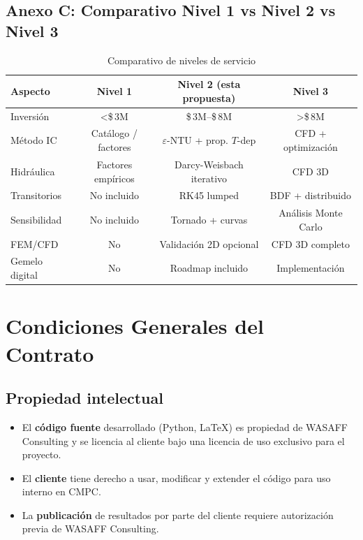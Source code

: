 \documentclass[11pt,a4paper]{article}
\begin{document}
\subsection{Anexo C: Comparativo Nivel 1 vs Nivel 2 vs Nivel 3}

\begin{table}[H]
\centering
\caption{Comparativo de niveles de servicio}
\begin{tabular}{@{}lccc@{}}
\toprule
\textbf{Aspecto} & \textbf{Nivel 1} & \textbf{Nivel 2 (esta propuesta)} & \textbf{Nivel 3} \\
\midrule
Inversión & <\$\,3M & \$\,3M--\$\,8M & >\$\,8M \\
Método IC & Catálogo / factores & $\varepsilon$-NTU + prop. $T$-dep & CFD + optimización \\
Hidráulica & Factores empíricos & Darcy-Weisbach iterativo & CFD 3D \\
Transitorios & No incluido & RK45 lumped & BDF + distribuido \\
Sensibilidad & No incluido & Tornado + curvas & Análisis Monte Carlo \\
FEM/CFD & No & Validación 2D opcional & CFD 3D completo \\
Gemelo digital & No & Roadmap incluido & Implementación \\
\bottomrule
\end{tabular}
\end{table}

\newpage

\section{Condiciones Generales del Contrato}

\subsection{Propiedad intelectual}

\begin{itemize}
  \item El \textbf{código fuente} desarrollado (Python, LaTeX) es propiedad de WASAFF Consulting y se licencia al cliente bajo una licencia de uso exclusivo para el proyecto.
  \item El \textbf{cliente} tiene derecho a usar, modificar y extender el código para uso interno en CMPC.
  \item La \textbf{publicación} de resultados por parte del cliente requiere autorización previa de WASAFF Consulting.
\end{itemize}
\end{document}
